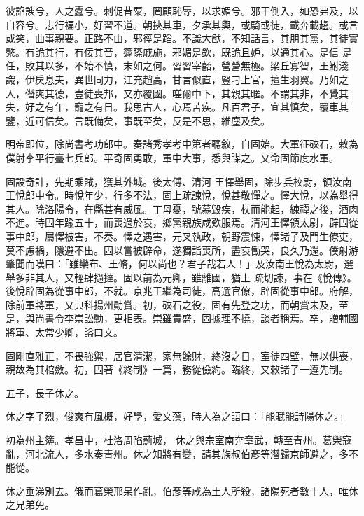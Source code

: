 \begin{pinyinscope}
 彼諂諛兮，人之蠹兮。刺促昔粟，罔顧恥辱，以求媚兮。邪干側入，如恐弗及，以自容兮。志行褊小，好習不道。朝挾其車，夕承其輿，或騎或徒，載奔載趨。或言或笑，曲事親要。正路不由，邪徑是蹈。不識大猷，不知話言，其朋其黨，其徒實繁。有詭其行，有佞其音，籧篨戚施，邪媚是欽，既詭且妒，以通其心。是信
 是任，敗其以多，不始不慎，末如之何。習習宰嚭，營營無極。梁丘寡智，王鮒淺識，伊戾息夫，異世同力，江充趙高，甘言似直，豎刁上官，擅生羽翼。乃如之人，僭爽其德，豈徒喪邦，又亦覆國。嗟爾中下，其親其暱。不謂其非，不覺其失，好之有年，寵之有日。我思古人，心焉苦疾。凡百君子，宜其慎矣，覆車其鑒，近可信矣。言既備矣，事既至矣，反是不思，維塵及矣。



 明帝即位，除尚書考功郎中。奏諸秀孝考中第者聽敘，自固始。大軍征硤石，敕為僕射李平行臺七兵郎。平奇固勇敢，軍中大事，悉與謀之。又命固節度水軍。



 固設奇計，先期乘賊，獲其外城。後太傅、清河
 王懌舉固，除步兵校尉，領汝南王悅郎中令。時悅年少，行多不法，固上疏諫悅，悅甚敬憚之。懌大悅，以為舉得其人。除洛陽令，在縣甚有威風。丁母憂，號慕毀疾，杖而能起，練禫之後，酒肉不進。時固年踰五十，而喪過於哀，鄉黨親族咸歎服焉。清河王懌領太尉，辟固從事中郎，屬懌被害，不奏。懌之遇害，元叉執政，朝野震悚，懌諸子及門生僚吏，莫不慮禍，隱避不出。固以嘗被辟命，遂獨詣喪所，盡哀慟哭，良久乃還。僕射游肇聞而嘆曰：「雖欒布、王脩，何以尚也？君子哉若人！」及汝南王悅為太尉，選舉多非其人，又輕肆撾撻。固以前為元卿，雖離國，猶上
 疏切諫，事在《悅傳》。後悅辟固為從事中郎，不就。京兆王繼為司徒，高選官僚，辟固從事中郎。府解，除前軍將軍，又典科揚州勛賞。初，硤石之役，固有先登之功，而朝賞未及，至是，與尚書令李崇訟勳，更相表。崇雖貴盛，固據理不撓，談者稱焉。卒，贈輔國將軍、太常少卿，謚曰文。



 固剛直雅正，不畏強禦，居官清潔，家無餘財，終沒之日，室徒四壁，無以供喪，親故為其棺斂。初，固著《終制》一篇，務從儉約。臨終，又敕諸子一遵先制。



 五子，長子休之。



 休之字子烈，俊爽有風概，好學，愛文藻，時人為之語曰：「能賦能詩陽休之。」



 初為州主簿。孝昌中，杜洛周陷薊城，
 休之與宗室南奔章武，轉至青州。葛榮寇亂，河北流人，多水奏青州。休之知將有變，請其族叔伯彥等潛歸京師避之，多不能從。



 休之垂涕別去。俄而葛榮邢杲作亂，伯彥等咸為土人所殺，諸陽死者數十人，唯休之兄弟免。




\end{pinyinscope}
